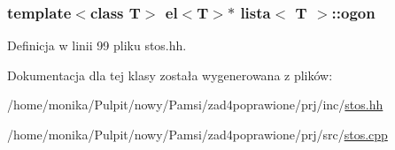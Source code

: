 \hypertarget{classlista_a9767a33d79ab3dbba6c82d74f518fc46}{
\subsubsection[{ogon}]{\setlength{\rightskip}{0pt plus 5cm}template$<$class \-T$>$ {\bf el}$<$\-T$>$$\ast$ {\bf lista}$<$ \-T $>$\-::{\bf ogon}}}\label{classlista_a9767a33d79ab3dbba6c82d74f518fc46}


\-Definicja w linii 99 pliku stos.\-hh.



\-Dokumentacja dla tej klasy została wygenerowana z plików\-:\begin{DoxyCompactItemize}
\item 
/home/monika/\-Pulpit/nowy/\-Pamsi/zad4poprawione/prj/inc/\hyperlink{stos_8hh}{stos.\-hh}\item 
/home/monika/\-Pulpit/nowy/\-Pamsi/zad4poprawione/prj/src/\hyperlink{stos_8cpp}{stos.\-cpp}\end{DoxyCompactItemize}
